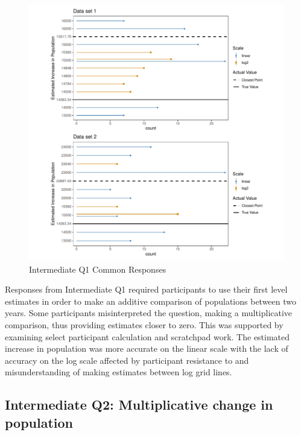 \documentclass[print]{nuthesis}
\begin{document}
\begin{figure}[tbp]

{\centering \includegraphics[width=1\linewidth,]{thesis_files/figure-latex/qi1-common-responses-1} 

}

\caption{Intermediate Q1 Common Responses}\label{fig:qi1-common-responses}
\end{figure}

Responses from Intermediate Q1 required participants to use their first level estimates in order to make an additive comparison of populations between two years.
Some participants misinterpreted the question, making a multiplicative comparison, thus providing estimates closer to zero.
This was supported by examining select participant calculation and scratchpad work.
The estimated increase in population was more accurate on the linear scale with the lack of accuracy on the log scale affected by participant resistance to and misunderstanding of making estimates between log grid lines.

\hypertarget{intermediate-q2-multiplicative-change-in-population}{%
\subsection{Intermediate Q2: Multiplicative change in population}\label{intermediate-q2-multiplicative-change-in-population}}
\end{document}
